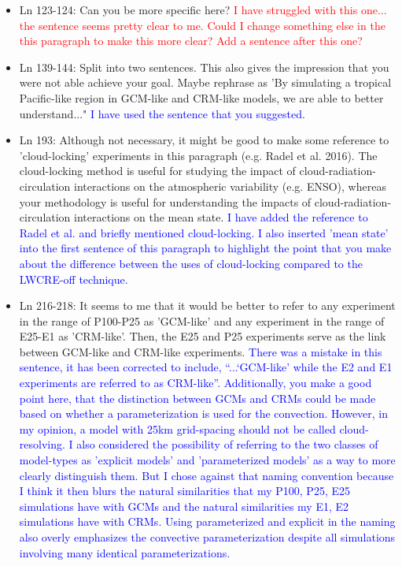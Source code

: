 \documentclass[draft]{agujournal2019}
\begin{document}
\begin{itemize}
  \item Ln 123-124: Can you be more specific here?
  \textcolor{red}{I have struggled with this one... the sentence seems pretty clear to me.  Could I change something else in the this paragraph to 
  make this more clear?  Add a sentence after this one?}
  
  \item Ln 139-144: Split into two sentences. This also gives the impression that you were not able achieve your goal. Maybe rephrase as 'By simulating a tropical Pacific-like region in GCM-like and CRM-like models, we are able to better understand..."
  \textcolor{blue}{I have used the sentence that you suggested.}
  
  \item Ln 193: Although not necessary, it might be good to make some reference to 'cloud-locking' experiments in this paragraph (e.g. Radel et al. 2016).  The cloud-locking method is useful for studying the impact of cloud-radiation-circulation interactions on the atmospheric variability (e.g. ENSO), whereas your methodology is useful for understanding the impacts of cloud-radiation-circulation interactions on the mean state. 
  \textcolor{blue}{I have added the reference to Radel et al. and briefly mentioned cloud-locking.  I also inserted 'mean state' into the first sentence of this paragraph to highlight the point that you make about the difference between the uses of cloud-locking compared to the LWCRE-off technique.}
  
  \item Ln 216-218: It seems to me that it would be better to refer to any experiment in the range of P100-P25 as 'GCM-like' and any experiment in the range of E25-E1 as 'CRM-like'. Then, the E25 and P25 experiments serve as the link between GCM-like and CRM-like experiments.
  \textcolor{blue}{There was a mistake in this sentence, it has been corrected to include, ``...`GCM-like' while the E2 and E1
  experiments are referred to as CRM-like''. Additionally, you make a good point here, that the distinction between GCMs and CRMs could be made based on whether a 
  parameterization is used for the convection.  However, in my opinion, a model with 25km grid-spacing should not be called cloud-resolving.  I also considered the possibility of referring to the two classes of model-types as 'explicit models' and 'parameterized models' as a way to more clearly distinguish them.  But I chose against that naming convention because I think it then blurs the natural similarities that my P100, P25, E25 simulations have with GCMs and the natural similarities my E1, E2 simulations have with CRMs.  Using parameterized and explicit in the naming also overly emphasizes the convective parameterization despite all simulations involving many identical parameterizations.}
  

\end{itemize}
\end{document}
